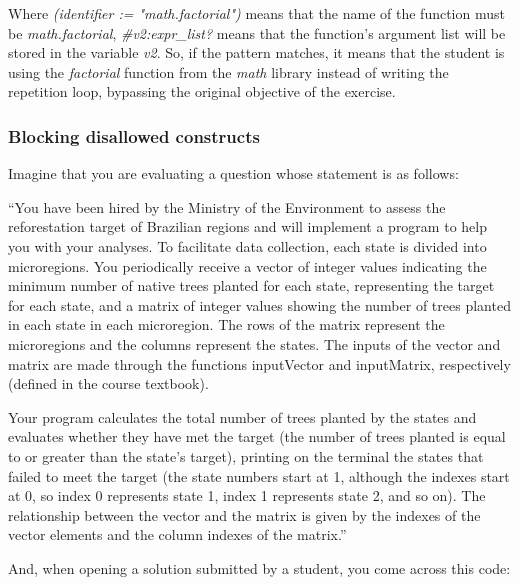 Where \textit{(identifier := "math.factorial")} means that the name of the
function must be \textit{math.factorial}, \textit{\#v2:expr\_list?} means
that the function's argument list will be stored in the variable \textit{v2}.
So, if the pattern matches, it means that the student is using the
\textit{factorial} function from the \textit{math} library instead of writing
the repetition loop, bypassing the original objective of the exercise.


\subsubsection{Blocking disallowed constructs}

Imagine that you are evaluating a question whose statement is as follows:

``You have been hired by the Ministry of the Environment to assess the reforestation
target of Brazilian regions and will implement a program to help you with your analyses.
To facilitate data collection, each state is divided into microregions.
You periodically receive a vector of integer values indicating the minimum number
of native trees planted for each state, representing the target for each state,
and a matrix of integer values showing the number of trees planted in each state
in each microregion. The rows of the matrix represent the microregions and the
columns represent the states. The inputs of the vector and matrix are made through
the functions inputVector and inputMatrix, respectively (defined in the course textbook).

Your program calculates the total number of trees planted by the states and
evaluates whether they have met the target (the number of trees planted is equal
to or greater than the state's target), printing on the terminal the states that
failed to meet the target (the state numbers start at 1, although the indexes
start at 0, so index 0 represents state 1, index 1 represents state 2, and so on).
The relationship between the vector and the matrix is given by the indexes of the
vector elements and the column indexes of the matrix.''

And, when opening a solution submitted by a student, you come across this code:


